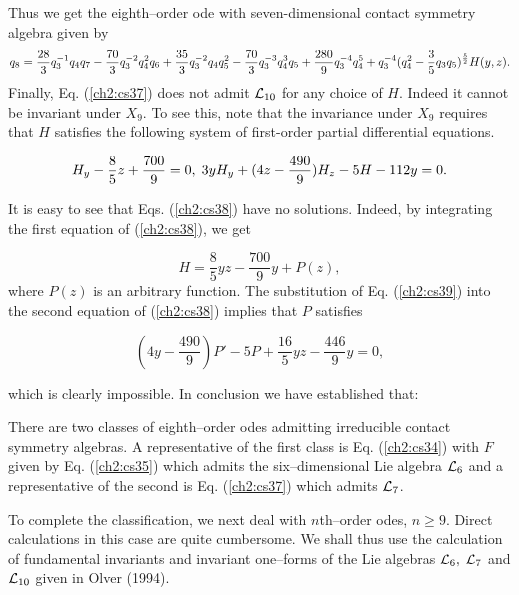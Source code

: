 Thus we get the eighth--order ode with seven-dimensional contact
symmetry algebra given by
\begin{equation}
q_8=\frac{28}{3}q_3^{-1}q_4q_7-\frac{70}{3}q_3^{-2}q_4^2q_6
+\frac{35}{3}q_3^{-2}q_4q_5^2-\frac{70}{3}q_3^{-3}q_4^3q_5\nonumber\\
+\frac{280}{9}q_3^{-4}q_4^5+q_3^{-4}(q_4^2
-\frac{3}{5}q_3q_5)^{\frac{5}{2}}H(y,z).
\label{ch2:cs37}
\end{equation}
Finally, Eq. (\ref{ch2:cs37}) does not admit ${\cal L}_{10}$ for any choice of $H$.
Indeed it cannot be invariant under $X_9$. To see this, note that the
invariance under $X_9$ requires that $H$  satisfies 
the following system of first-order partial differential equations.

\begin{equation}
H_y-\frac{8}{5}z+\frac{700}{9}=0,\;\;\nonumber\\
3yH_y+(4z-\frac{490}{9})H_z-5H-112y=0.
\label{ch2:cs38}
\end{equation}

It is easy to see that Eqs. (\ref{ch2:cs38}) have no solutions.
Indeed, by integrating the first equation of (\ref{ch2:cs38}), we get 

\begin{equation}
H=\frac{8}{5}yz-\frac{700}{9}y+P(z),
\label{ch2:cs39}
\end{equation}
where $P(z)$ is an arbitrary function. The substitution of
Eq. (\ref{ch2:cs39}) into the second equation of (\ref{ch2:cs38}) implies that
$P$ satisfies 

\[(4y-\frac{490}{9})P'-5P+\frac{16}{5}yz-\frac{446}{9}y=0,\]

which is clearly impossible. In conclusion we have established that:

\begin{theo}
\label{ch2:8cont}
\begin{em}
There are  two classes of eighth--order odes admitting
irreducible contact
symmetry algebras. A representative of the first class is Eq. (\ref{ch2:cs34})
with $F$ given by Eq. (\ref{ch2:cs35}) which admits the six--dimensional
Lie algebra ${\cal L}_6$ and  a representative of the
second is Eq. (\ref{ch2:cs37}) which admits ${\cal L}_7$.
\end{em}
\end{theo}
To complete the classification, we next deal with $n$th--order odes,
$n \ge 9 $. Direct calculations in this case are quite cumbersome. We shall
thus use the calculation of fundamental invariants and invariant one--forms
of the Lie algebras ${\cal L}_6,\;{\cal L}_7$ and ${\cal L}_{10}$ given in Olver (1994).

